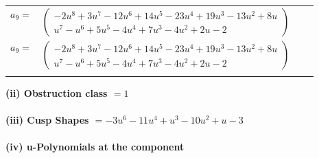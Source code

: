\documentclass[1p]{elsarticle_modified}
\theoremstyle{definition}
\begin{document}
\begin{tabular}{m{7pt} m{180pt} m{7pt} m{180pt} }
\flushright $a_{9}=$&$\begin{pmatrix}-2 u^8+3 u^7-12 u^6+14 u^5-23 u^4+19 u^3-13 u^2+8 u\\u^7- u^6+5 u^5-4 u^4+7 u^3-4 u^2+2 u-2\end{pmatrix}$\\ \flushright $a_{9}=$&$\begin{pmatrix}-2 u^8+3 u^7-12 u^6+14 u^5-23 u^4+19 u^3-13 u^2+8 u\\u^7- u^6+5 u^5-4 u^4+7 u^3-4 u^2+2 u-2\end{pmatrix}$\\&\end{tabular}
\flushleft \textbf{(ii) Obstruction class $= 1$}\\~\\
\flushleft \textbf{(iii) Cusp Shapes $= -3 u^6-11 u^4+u^3-10 u^2+u-3$}\\~\\
\newpage\renewcommand{\arraystretch}{1}
\flushleft \textbf{(iv) u-Polynomials at the component}\newline \\
\end{document}
